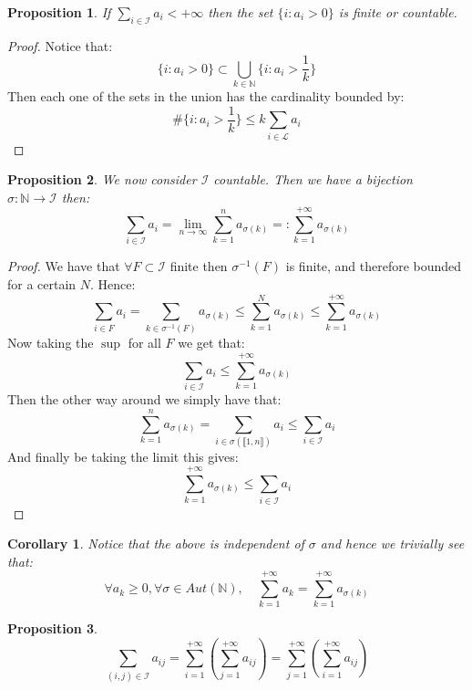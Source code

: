 \documentclass[10pt,a4paper]{book}
\newtheorem{corollary}{Corollary}[theorem]
\newtheorem{proposition}{Proposition}[section]
\theoremstyle{definition}
\begin{document}
\begin{proposition}

If $\sum_{i \in \mathcal{I}} a_i < +\infty$ then the set $\{i : a_i > 0\}$ is finite or countable.

\end{proposition}

\begin{proof}

Notice that:
\[
\{ i : a_i > 0\} \subset \bigcup_{k \in \mathbb{N}} \{i : a_i > \frac{1}{k}\}
\]
Then each one of the sets in the union has the cardinality bounded by:
\[
\#\{ i : a_i > \frac{1}{k} \} \leq k \sum_{i \in \mathcal{L}} a_i
\]

\end{proof}

\begin{proposition}

We now consider $\mathcal{I}$ countable. Then we have a bijection $\sigma : \mathbb{N} \to \mathcal{I}$ then:
\[
\sum_{i \in \mathcal{I}} a_i = \lim_{n \to \infty} \sum_{k = 1}^n a_{\sigma(k)} =: \sum_{k = 1}^{+\infty} a_{\sigma(k)}
\]

\end{proposition}

\begin{proof}

We have that $\forall F \subset \mathcal{I}$ finite then $\sigma^{-1}(F)$ is finite, and therefore bounded for a certain $N$. Hence:
\[
\sum_{i \in F} a_i = \sum_{k \in \sigma^{-1}(F)} a_{\sigma(k)} \leq \sum_{k = 1}^N a_{\sigma(k)} \leq \sum_{k = 1}^{+\infty} a_{\sigma(k)}
\]
Now taking the $\sup$ for all $F$ we get that:
\[
\sum_{i \in \mathcal{I}} a_i \leq \sum_{k = 1}^{+\infty} a_{\sigma(k)}
\]
Then the other way around we simply have that:
\[
\sum_{k = 1}^{n} a_{\sigma(k)} = \sum_{i \in \sigma(\llbracket 1, n \rrbracket)} a_i \leq \sum_{i \in \mathcal{I}} a_i
\]
And finally be taking the limit this gives:
\[
\sum_{k= 1}^{+\infty} a_{\sigma(k)} \leq \sum_{i \in \mathcal{I}} a_i
\]
\end{proof}

\begin{corollary}
Notice that the above is independent of $\sigma$ and hence we trivially see that:
\[
\forall a_k \geq 0, \forall \sigma \in Aut(\mathbb{N}),\quad \sum_{k = 1}^{+\infty} a_k = \sum_{k = 1}^{+\infty} a_{\sigma(k)} 
\]
\end{corollary}

\begin{proposition}
\[
\sum_{(i, j) \in \mathcal{I}} a_{ij} = \sum_{i = 1}^{+\infty} \left( \sum_{j = 1}^{+\infty} a_{ij} \right) = \sum_{j = 1}^{+\infty} \left( \sum_{i = 1}^{+\infty} a_{ij} \right)
\]
\end{proposition}
\end{document}
